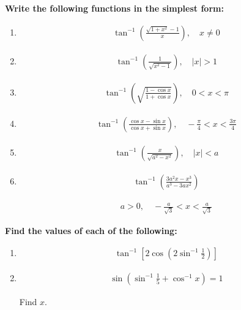 \documentclass[12pt]{article}
\begin{document}
\vspace{0.5cm}

\textbf{Write the following functions in the simplest form:}

\begin{enumerate}

\item[5.]

\begin{align*}
\tan^{-1}
\left(
\frac{\sqrt{1+x^2}-1}{x}
\right),
\quad x \neq 0
\end{align*}

\item[6.]

\begin{align*}
\tan^{-1}
\left(
\frac{1}{\sqrt{x^2-1}}
\right),
\quad |x|>1
\end{align*}

\item[7.]

\begin{align*}
\tan^{-1}
\left(
\sqrt{
\frac{1-\cos x}{1+\cos x}
}
\right),
\quad 0<x<\pi
\end{align*}

\item[8.]

\begin{align*}
\tan^{-1}
\left(
\frac{\cos x-\sin x}
{\cos x+\sin x}
\right),
\quad
-\frac{\pi}{4}
<
x
<
\frac{3\pi}{4}
\end{align*}

\item[9.]

\begin{align*}
\tan^{-1}
\left(
\frac{x}{\sqrt{a^2-x^2}}
\right),
\quad |x|<a
\end{align*}

\item[10.]

\begin{align*}
\tan^{-1}
\left(
\frac{3a^2x-x^3}
{a^3-3ax^2}
\right)
\end{align*}

\begin{align*}
a>0,
\quad
-\frac{a}{\sqrt{3}}
<
x
<
\frac{a}{\sqrt{3}}
\end{align*}

\end{enumerate}

\vspace{0.5cm}

\textbf{Find the values of each of the following:}

\begin{enumerate}

\item[11.]

\begin{align*}
\tan^{-1}
\left[
2\cos
\left(
2\sin^{-1}\frac{1}{2}
\right)
\right]
\end{align*}

\item[12.]

\begin{align*}
\sin
\left(
\sin^{-1}\frac{1}{5}
+
\cos^{-1}x
\right)
=
1
\end{align*}

Find $x$.

\end{enumerate}
\end{document}
